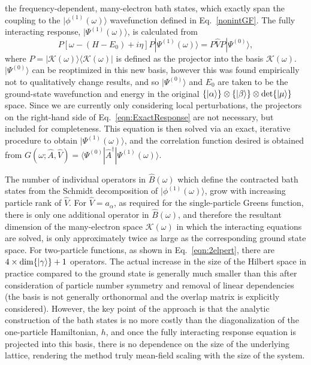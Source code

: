 \documentclass[aps,showpacs,twocolumn,nobibnotes]{revtex4}
\begin{document}
the frequency-dependent, many-electron bath states, which exactly span the coupling to the $|\phi^{(1)}(\omega) \rangle$ wavefunction defined in Eq.~\ref{nonintGF}.
The fully interacting response, $|\Psi^{(1)}(\omega) \rangle$, is calculated from
\begin{equation}
    P \left[ \omega - (H-E_0) + i \eta \right] P | \Psi^{(1)}(\omega) \rangle = P {\hat V} P |\Psi^{(0)} \rangle   ,   \label{eqn:ExactResponse}
\end{equation}
where $P=|\mathcal{K}(\omega) \rangle \langle \mathcal{K}(\omega) |$ is defined as the projector into the basis $\mathcal{K}(\omega)$. 
$|\Psi^{(0)} \rangle$ can be reoptimized in this new basis, however this was found empirically not to qualitatively change results, and 
so $|\Psi^{(0)}\rangle$ and $E_0$ are taken to be the ground-state wavefunction and energy in the 
original $\{|\alpha \rangle \} \otimes \{ |\beta \rangle \} \otimes \text{\textnormal {det}} \{ | \mu \rangle \} $ space. 
Since we are currently only considering local perturbations,
the projectors on the right-hand side of Eq.~\ref{eqn:ExactResponse} are not necessary, but included for completeness.
This equation is then solved via an exact, iterative procedure to obtain $| \Psi^{(1)}(\omega) \rangle$, and the correlation function desired is obtained from 
$G(\omega;{\hat A},{\hat V})=\langle \Psi^{(0)} | {\hat A}^{\dagger} | \Psi^{(1)}(\omega) \rangle$.

The number of individual operators in ${\hat B}(\omega)$ which define the contracted bath states from the Schmidt decomposition 
of $|\phi^{(1)}(\omega) \rangle$, grow with increasing particle rank of ${\hat V}$. For ${\hat V}=a_{\alpha}$, as required for the single-particle Greens function,
there is only one additional operator in ${\hat B}(\omega)$, and therefore the resultant dimension of the many-electron space $\mathcal{K}(\omega)$ in 
which the interacting equations are solved, is only approximately twice as large as the corresponding ground state space. For two-particle functions,
as shown in Eq.~\ref{eqn:2elpert}, there are $4 \times \text{\textnormal {dim}}\{|\gamma \rangle \} + 1$ operators. The actual increase in the size of the Hilbert
space in practice compared to the ground state is generally much smaller than this after consideration of particle number symmetry and removal of linear
dependencies (the basis is not generally orthonormal and the overlap matrix is explicitly considered). However, the key point of the 
approach is that the analytic construction of the bath states is no more costly than the diagonalization of the one-particle Hamiltonian, $h$, and once the
fully interacting response equation is projected into this basis, there is no dependence on the size of the underlying lattice, rendering the method
truly mean-field scaling with the size of the system. 
\end{document}

